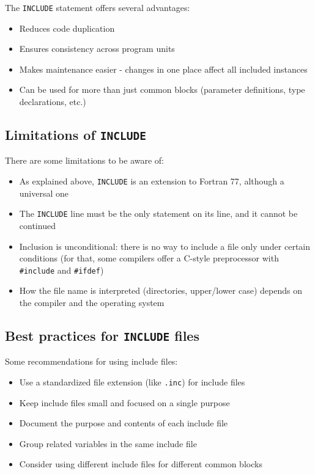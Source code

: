 The \texttt{INCLUDE} statement offers several advantages:

\begin{itemize}
    \item Reduces code duplication
    \item Ensures consistency across program units
    \item Makes maintenance easier - changes in one place affect all included instances
    \item Can be used for more than just common blocks (parameter definitions, type declarations, etc.)
\end{itemize}

\subsection{Limitations of \texttt{INCLUDE}}

There are some limitations to be aware of:

\begin{itemize}
    \item As explained above, \texttt{INCLUDE} is an extension to Fortran 77, although a universal one
    \item The \texttt{INCLUDE} line must be the only statement on its line, and it cannot be continued
    \item Inclusion is unconditional: there is no way to include a file only under certain conditions (for that, some compilers offer a C-style preprocessor with \texttt{\#include} and \texttt{\#ifdef})
    \item How the file name is interpreted (directories, upper/lower case) depends on the compiler and the operating system
\end{itemize}

\subsection{Best practices for \texttt{INCLUDE} files}

Some recommendations for using include files:

\begin{itemize}
    \item Use a standardized file extension (like \texttt{.inc}) for include files
    \item Keep include files small and focused on a single purpose
    \item Document the purpose and contents of each include file
    \item Group related variables in the same include file
    \item Consider using different include files for different common blocks
\end{itemize}

